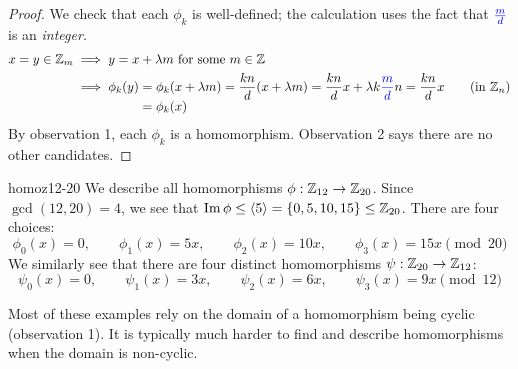 \begin{proof}
	We check that each $\phi_k$ is well-defined; the calculation uses the fact that $\textcolor{blue}{\frac md}$ is an \emph{integer.} 
	\begin{align*}
		x=y\in\Z_m
		&\implies y=x+\lambda m \text{ for some $m\in\Z$}\\
		&\implies \phi_k(y)
		\begin{array}[t]{@{\;}l@{}}
			=\phi_k(x+\lambda m)
			=\dfrac{kn}d(x+\lambda m) 
			=\dfrac{kn}dx+\lambda k\textcolor{blue}{\dfrac md} n
			=\dfrac{kn}dx\\
			=\phi_k(x)
		\end{array}
		\tag{in $\Z_n$}
	\end{align*}
	By observation 1, each $\phi_k$ is a homomorphism. Observation 2 says there are no other candidates.
\end{proof}


\begin{example}{}{homoz12-20}
	We describe all homomorphisms $\phi:\mathbb{Z}_{12}\to\mathbb{Z}_{20}$.\smallbreak
	Since $\gcd(12,20)=4$, we see that $\operatorname{Im}\phi\le\left\langle 5\right\rangle=\{0,5,10,15\}\le\mathbb{Z}_{20}$. There are four choices:
	\[
		\phi_0(x)=0,\qquad 
		\phi_1(x)=5x,\qquad 
		\phi_2(x)=10x,\qquad 
		\phi_3(x)=15x\pmod{20}
	\]
	We similarly see that there are four distinct homomorphisms $\psi:\mathbb{Z}_{20}\to\mathbb{Z}_{12}$:
	\[
		\psi_0(x)=0,\qquad 
		\psi_1(x)=3x,\qquad 
		\psi_2(x)=6x,\qquad 
		\psi_3(x)=9x\pmod{12}
	\]
\end{example} 

Most of these examples rely on the domain of a homomorphism being cyclic (observation 1). It is typically much harder to find and describe homomorphisms when the domain is non-cyclic.

\goodbreak


